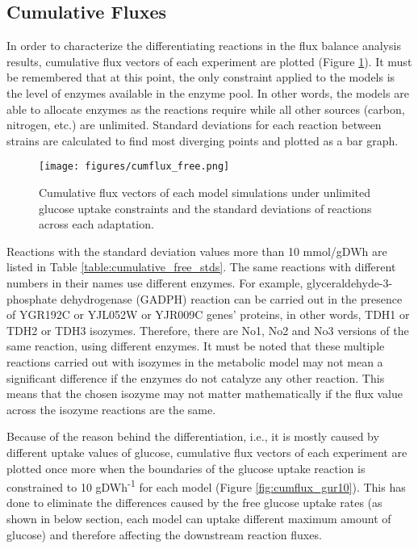  \subsection{Cumulative Fluxes}

In order to characterize the differentiating reactions in the flux balance analysis results, cumulative flux vectors of each experiment are plotted (Figure \ref{fig:cumflux_free}). It must be remembered that at this point, the only constraint applied to the models is the level of enzymes available in the enzyme pool. In other words, the models are able to allocate enzymes as the reactions require while all other sources (carbon, nitrogen, etc.) are unlimited. Standard deviations for each reaction between strains are calculated to find most diverging points and plotted as a bar graph.

\begin{figure}[H]
  \begin{center}
  \texttt{[image: figures/cumflux\_free.png]}
  \caption[Cumulative flux vectors of each model simulations under unlimited glucose uptake constraints and the standard deviations of reactions across each adaptation]{Cumulative flux vectors of each model simulations under unlimited glucose uptake constraints and the standard deviations of reactions across each adaptation.}
  \label{fig:cumflux_free}
  \end{center}
\end{figure}

Reactions with the standard deviation values more than 10 mmol/gDWh are listed in Table \ref{table:cumulative_free_stds}. The same reactions with different numbers in their names use different enzymes. For example, glyceraldehyde-3-phosphate dehydrogenase (GADPH) reaction can be carried out in the presence of YGR192C or YJL052W or YJR009C genes' proteins, in other words, TDH1 or TDH2 or TDH3 isozymes. Therefore, there are No1, No2 and No3 versions of the same reaction, using different enzymes. It must be noted that these multiple reactions carried out with isozymes in the metabolic model may not mean a significant difference if the enzymes do not catalyze any other reaction. This means that the chosen isozyme may not matter mathematically if the flux value across the isozyme reactions are the same.


Because of the reason behind the differentiation, i.e., it is mostly caused by different uptake values of glucose, cumulative flux vectors of each experiment are plotted once more when the boundaries of the glucose uptake reaction is constrained to 10 gDWh\textsuperscript{-1} for each model (Figure \ref{fig:cumflux_gur10}). This has done to eliminate the differences caused by the free glucose uptake rates (as shown in below section, each model can uptake different maximum amount of glucose) and therefore affecting the downstream reaction fluxes.

